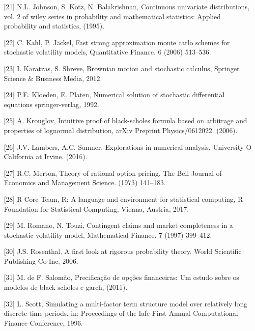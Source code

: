 \documentclass[12pt,twoside]{reedthesis}
\theoremstyle{definition}
\theoremstyle{definition}
\theoremstyle{remark}
\begin{document}
  \hypertarget{ref-johnson1995}{}
  {[}21{]} N.L. Johnson, S. Kotz, N. Balakrishnan, Continuous univariate
  distributions, vol. 2 of wiley series in probability and mathematical
  statistics: Applied probability and statistics, (1995).
  
  \hypertarget{ref-kahl2006fast}{}
  {[}22{]} C. Kahl, P. Jäckel, Fast strong approximation monte carlo
  schemes for stochastic volatility models, Quantitative Finance. 6 (2006)
  513--536.
  
  \hypertarget{ref-karatzas2012brownian}{}
  {[}23{]} I. Karatzas, S. Shreve, Brownian motion and stochastic
  calculus, Springer Science \& Business Media, 2012.
  
  \hypertarget{ref-kloeden1992}{}
  {[}24{]} P.E. Kloeden, E. Platen, Numerical solution of stochastic
  differential equations springer-verlag, 1992.
  
  \hypertarget{ref-krouglov2006intuitive}{}
  {[}25{]} A. Krouglov, Intuitive proof of black-scholes formula based on
  arbitrage and properties of lognormal distribution, arXiv Preprint
  Physics/0612022. (2006).
  
  \hypertarget{ref-lambers}{}
  {[}26{]} J.V. Lambers, A.C. Sumner, Explorations in numerical analysis,
  University O California at Irvine. (2016).
  
  \hypertarget{ref-merton1973theory}{}
  {[}27{]} R.C. Merton, Theory of rational option pricing, The Bell
  Journal of Economics and Management Science. (1973) 141--183.
  
  \hypertarget{ref-rlang}{}
  {[}28{]} R Core Team, R: A language and environment for statistical
  computing, R Foundation for Statistical Computing, Vienna, Austria,
  2017.
  
  \hypertarget{ref-romano1997}{}
  {[}29{]} M. Romano, N. Touzi, Contingent claims and market completeness
  in a stochastic volatility model, Mathematical Finance. 7 (1997)
  399--412.
  
  \hypertarget{ref-rosenthal}{}
  {[}30{]} J.S. Rosenthal, A first look at rigorous probability theory,
  World Scientific Publishing Co Inc, 2006.
  
  \hypertarget{ref-salomao2011precificaccao}{}
  {[}31{]} M. de F. Salomão, Precificação de opções financeiras: Um estudo
  sobre os modelos de black scholes e garch, (2011).
  
  \hypertarget{ref-scott1996}{}
  {[}32{]} L. Scott, Simulating a multi-factor term structure model over
  relatively long discrete time periods, in: Proceedings of the Iafe First
  Annual Computational Finance Conference, 1996.
  
\end{document}
